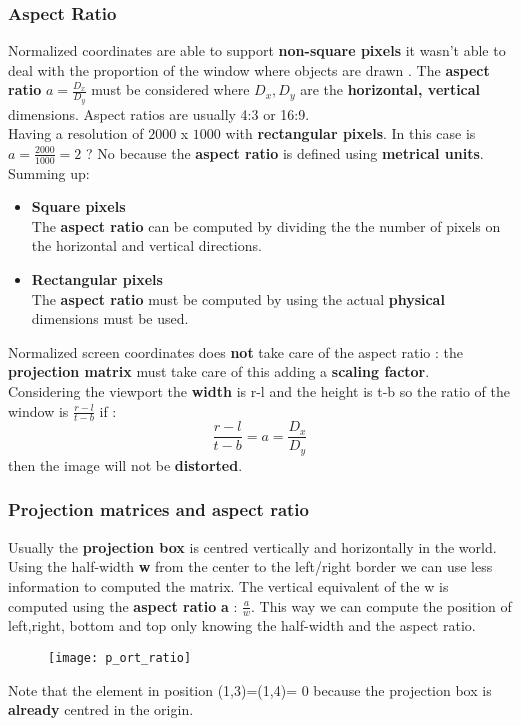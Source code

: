 \subsubsection{Aspect Ratio}
Normalized coordinates are able to support \textbf{non-square pixels} it wasn't able to deal with the proportion of the window where objects are drawn .
The \textbf{aspect ratio } $a = \frac{D_x}{D_y}$ must be considered where $D_x ,D_y$ are the \textbf{horizontal, vertical} dimensions. Aspect ratios are usually 4:3 or 16:9.\\
Having a resolution of $2000$ x $1000$ with \textbf{rectangular pixels}. In this case is $a = \frac{2000}{1000} = 2$ ? No because the \textbf{aspect ratio} is defined using \textbf{metrical units}. Summing up:
\begin{itemize}
\item\textbf{Square pixels}\\
The \textbf{aspect ratio} can be computed by dividing the the number of pixels on the horizontal and vertical directions.
\item\textbf{Rectangular pixels}\\
The \textbf{aspect ratio} must be computed by using the actual \textbf{physical} dimensions must be used.
\end{itemize}
Normalized screen coordinates does \textbf{not} take care of the aspect ratio : 
the \textbf{projection matrix } must take care of this adding a \textbf{scaling factor}.\\
Considering the viewport the \textbf{width} is r-l and the height is t-b so the ratio of the window is $ \frac{r-l}{t-b}$ if : 
$$\frac{r-l}{t-b} = a =\frac{D_x}{D_y} $$ 
then the image will not be \textbf{distorted}. 
\newpage
\subsubsection{Projection matrices and aspect ratio}
Usually the \textbf{projection box} is centred vertically and horizontally in the world. Using the half-width \textbf{w} from the center to the left/right border we can use less information to computed the matrix. The vertical equivalent of the w is computed using the \textbf{aspect ratio} \textbf{a} : $\frac{a}{w}$.
This way we can compute the position of left,right, bottom and top only knowing the half-width and the aspect ratio.
\begin{figure}[H]
 \centering
  \texttt{[image: p\_ort\_ratio]}
\end{figure}
Note that the element in position (1,3)=(1,4)= 0 because the projection box is \textbf{already} centred in the origin.
 


